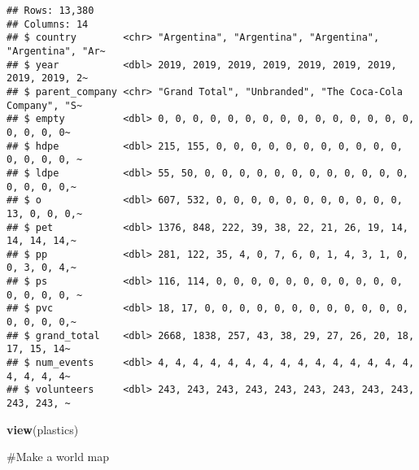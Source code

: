 \documentclass[
]{article}
\newenvironment{Shaded}{\begin{snugshade}}{\end{snugshade}}
\newcommand{\FunctionTok}[1]{\textcolor[rgb]{0.13,0.29,0.53}{\textbf{#1}}}
\newcommand{\NormalTok}[1]{#1}
\begin{document}
\begin{verbatim}
## Rows: 13,380
## Columns: 14
## $ country        <chr> "Argentina", "Argentina", "Argentina", "Argentina", "Ar~
## $ year           <dbl> 2019, 2019, 2019, 2019, 2019, 2019, 2019, 2019, 2019, 2~
## $ parent_company <chr> "Grand Total", "Unbranded", "The Coca-Cola Company", "S~
## $ empty          <dbl> 0, 0, 0, 0, 0, 0, 0, 0, 0, 0, 0, 0, 0, 0, 0, 0, 0, 0, 0~
## $ hdpe           <dbl> 215, 155, 0, 0, 0, 0, 0, 0, 0, 0, 0, 0, 0, 0, 0, 0, 0, ~
## $ ldpe           <dbl> 55, 50, 0, 0, 0, 0, 0, 0, 0, 0, 0, 0, 0, 0, 0, 0, 0, 0,~
## $ o              <dbl> 607, 532, 0, 0, 0, 0, 0, 0, 0, 0, 0, 0, 0, 13, 0, 0, 0,~
## $ pet            <dbl> 1376, 848, 222, 39, 38, 22, 21, 26, 19, 14, 14, 14, 14,~
## $ pp             <dbl> 281, 122, 35, 4, 0, 7, 6, 0, 1, 4, 3, 1, 0, 0, 3, 0, 4,~
## $ ps             <dbl> 116, 114, 0, 0, 0, 0, 0, 0, 0, 0, 0, 0, 0, 0, 0, 0, 0, ~
## $ pvc            <dbl> 18, 17, 0, 0, 0, 0, 0, 0, 0, 0, 0, 0, 0, 0, 0, 0, 0, 0,~
## $ grand_total    <dbl> 2668, 1838, 257, 43, 38, 29, 27, 26, 20, 18, 17, 15, 14~
## $ num_events     <dbl> 4, 4, 4, 4, 4, 4, 4, 4, 4, 4, 4, 4, 4, 4, 4, 4, 4, 4, 4~
## $ volunteers     <dbl> 243, 243, 243, 243, 243, 243, 243, 243, 243, 243, 243, ~
\end{verbatim}

\begin{Shaded}
\begin{Highlighting}[]
\FunctionTok{view}\NormalTok{(plastics)}
\end{Highlighting}
\end{Shaded}

\#Make a world map
\end{document}
